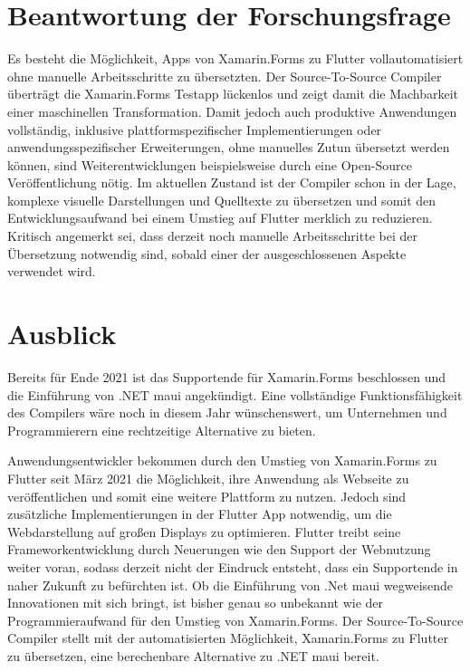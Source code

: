 \section{Beantwortung der Forschungsfrage}
Es besteht die Möglichkeit,  Apps von Xamarin.Forms zu Flutter vollautomatisiert ohne manuelle 
Arbeitsschritte zu übersetzten.  Der Source-To-Source Compiler überträgt die Xamarin.Forms Testapp lückenlos und zeigt damit die Machbarkeit einer maschinellen Transformation.   Damit jedoch auch produktive Anwendungen vollständig, inklusive plattformspezifischer Implementierungen oder anwendungsspezifischer Erweiterungen, ohne manuelles Zutun übersetzt werden können,  sind 
Weiterentwicklungen beispielsweise durch eine Open-Source Veröffentlichung nötig.
Im aktuellen Zustand ist der Compiler schon in der Lage,  komplexe visuelle Darstellungen
und Quelltexte zu übersetzen und somit den Entwicklungsaufwand bei einem Umstieg auf Flutter 
merklich zu reduzieren.
Kritisch angemerkt sei,  dass derzeit noch manuelle Arbeitsschritte bei der Übersetzung notwendig sind,  sobald einer der ausgeschlossenen Aspekte verwendet wird.


\section{Ausblick}
Bereits für Ende 2021 ist das Supportende für Xamarin.Forms beschlossen und die Einführung von 
.NET \ac{maui} angekündigt.  Eine vollständige Funktionsfähigkeit des Compilers wäre noch in diesem Jahr wünschenswert,  um Unternehmen und Programmierern eine rechtzeitige Alternative zu bieten. 

Anwendungsentwickler bekommen durch den Umstieg von Xamarin.Forms zu Flutter seit März 2021 die Möglichkeit,  ihre Anwendung als Webseite zu veröffentlichen und somit eine weitere Plattform zu nutzen.  Jedoch sind zusätzliche Implementierungen in der Flutter App notwendig,  um die Webdarstellung auf großen Displays zu optimieren.  Flutter treibt seine Frameworkentwicklung durch Neuerungen wie den Support der Webnutzung weiter voran,  sodass derzeit nicht der 
Eindruck entsteht, dass ein Supportende in naher Zukunft zu befürchten ist. 
Ob die Einführung von .Net \ac{maui} wegweisende Innovationen mit sich bringt,  ist bisher genau so unbekannt wie der Programmieraufwand für den Umstieg von Xamarin.Forms.  Der Source-To-Source Compiler stellt mit der automatisierten Möglichkeit,  Xamarin.Forms zu Flutter zu übersetzen,  eine berechenbare Alternative zu .NET \ac{maui} bereit.